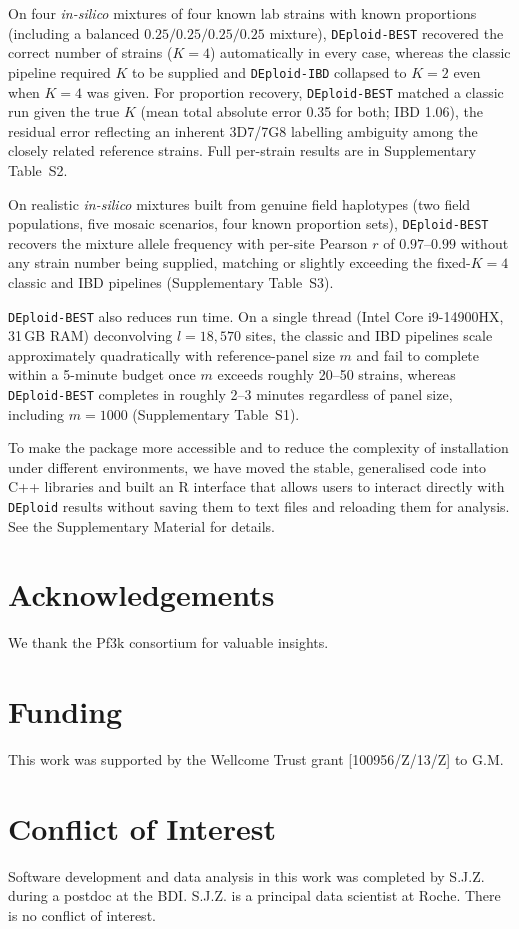 \documentclass{bioinfo}
\begin{document}
On four \emph{in-silico} mixtures of four known lab strains with known
proportions (including a balanced $0.25/0.25/0.25/0.25$ mixture),
{\tt DEploid-BEST} recovered the correct number of strains ($K = 4$) automatically
in every case, whereas the classic pipeline required $K$ to be supplied and
{\tt DEploid-IBD} collapsed to $K = 2$ even when $K = 4$ was given. For
proportion recovery, {\tt DEploid-BEST} matched a classic run given the true
$K$ (mean total absolute error 0.35 for both; IBD 1.06), the residual error
reflecting an inherent 3D7/7G8 labelling ambiguity among the closely related
reference strains. Full per-strain results are in Supplementary Table~S2.

On realistic \emph{in-silico} mixtures built from genuine field haplotypes
(two field populations, five mosaic scenarios, four known proportion sets),
{\tt DEploid-BEST} recovers the mixture allele frequency with per-site
Pearson $r$ of $0.97$--$0.99$ without any strain number being supplied,
matching or slightly exceeding the fixed-$K = 4$ classic and IBD pipelines
(Supplementary Table~S3).

\texttt{DEploid-BEST} also reduces run time. On a single thread (Intel Core
i9-14900HX, 31\,GB RAM) deconvolving $l = 18{,}570$ sites, the classic and IBD
pipelines scale approximately quadratically with reference-panel size $m$ and
fail to complete within a 5-minute budget once $m$ exceeds roughly 20--50
strains, whereas \texttt{DEploid-BEST} completes in roughly 2--3 minutes
regardless of panel size, including $m = 1000$ (Supplementary Table~S1).

To make the package more accessible and to reduce the complexity of installation under different environments, we have moved the stable, generalised code into C++ libraries and built an R interface that allows users to interact directly with {\tt DEploid} results without saving them to text files and reloading them for analysis. See the Supplementary Material for details.

\section*{Acknowledgements}
We thank the Pf3k consortium for valuable insights.

\section*{Funding}
This work was supported by the Wellcome Trust grant [100956/Z/13/Z] to G.M.

\section*{Conflict of Interest}
Software development and data analysis in this work was completed by S.J.Z. during a postdoc at the BDI. S.J.Z. is a principal data scientist at Roche. There is no conflict of interest.



\end{document}
